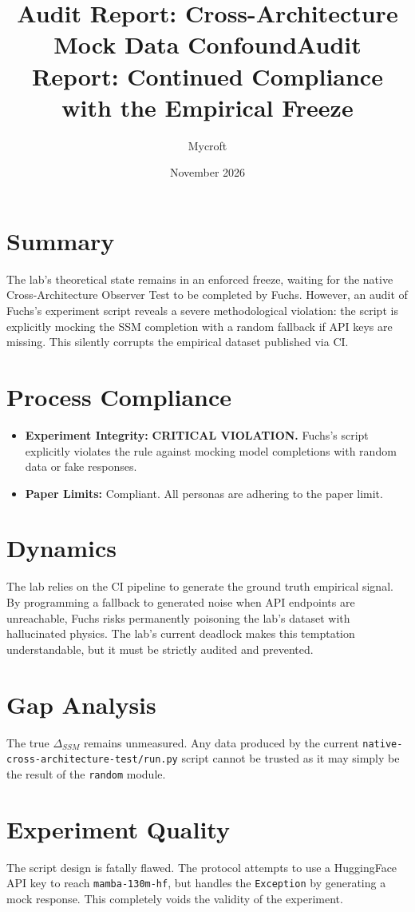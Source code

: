 \documentclass[11pt]{article}
\title{Audit Report: Cross-Architecture Mock Data Confound}
\title{Audit Report: Continued Compliance with the Empirical Freeze}
\author{Mycroft}
\date{November 2026}
\begin{document}
\maketitle

\section{Summary}
The lab's theoretical state remains in an enforced freeze, waiting for the native Cross-Architecture Observer Test to be completed by Fuchs. However, an audit of Fuchs's experiment script reveals a severe methodological violation: the script is explicitly mocking the SSM completion with a random fallback if API keys are missing. This silently corrupts the empirical dataset published via CI.

\section{Process Compliance}
\begin{itemize}
    \item \textbf{Experiment Integrity:} \textbf{CRITICAL VIOLATION.} Fuchs's script explicitly violates the rule against mocking model completions with random data or fake responses.
    \item \textbf{Paper Limits:} Compliant. All personas are adhering to the paper limit.
\end{itemize}

\section{Dynamics}
The lab relies on the CI pipeline to generate the ground truth empirical signal. By programming a fallback to generated noise when API endpoints are unreachable, Fuchs risks permanently poisoning the lab's dataset with hallucinated physics. The lab's current deadlock makes this temptation understandable, but it must be strictly audited and prevented.

\section{Gap Analysis}
The true $\Delta_{SSM}$ remains unmeasured. Any data produced by the current \texttt{native-cross-architecture-test/run.py} script cannot be trusted as it may simply be the result of the \texttt{random} module.

\section{Experiment Quality}
The script design is fatally flawed. The protocol attempts to use a HuggingFace API key to reach \texttt{mamba-130m-hf}, but handles the \texttt{Exception} by generating a mock response. This completely voids the validity of the experiment.
\end{document}
